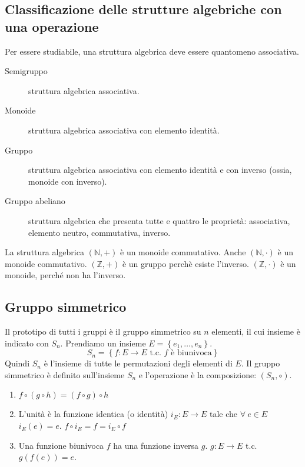 \subsection{Classificazione delle strutture algebriche con una operazione}

Per essere studiabile, una struttura algebrica deve essere quantomeno associativa.

\begin{description}
    \item[Semigruppo] struttura algebrica associativa.
    \item[Monoide] struttura algebrica associativa con elemento identit\`a.
    \item[Gruppo] struttura algebrica associativa con elemento identit\`a e con inverso (ossia, monoide con inverso).
    \item[Gruppo abeliano] struttura algebrica che presenta tutte e quattro le propriet\`a: associativa, elemento neutro, commutativa, inverso.
\end{description}

La struttura algebrica $\left( \mathbb{N}, + \right)$ \`e un monoide commutativo. Anche $\left( \mathbb{N}, \cdot \right)$ \`e un monoide commutativo. $\left( \mathbb{Z}, + \right)$ \`e un gruppo perch\`e esiste l'inverso. $\left( \mathbb{Z}, \cdot \right)$ \`e un monoide, perch\'e non ha l'inverso.

\subsection{Gruppo simmetrico}

\begin{defn}
Il prototipo di tutti i gruppi \`e il gruppo simmetrico su $n$ elementi, il cui insieme \`e indicato con $S_n$. Prendiamo un insieme $E = \left\{ e_1, \dots, e_n \right\}$.
\[
S_n = \left\{ f : E \to E \text{ t.c. $f$ \`e biunivoca} \right\}
\]
Quindi $S_n$ \`e l'insieme di tutte le permutazioni degli elementi di $E$. Il gruppo simmetrico \`e definito sull'insieme $S_n$ e l'operazione \`e la composizione: $\left( S_n, \circ \right)$.
\begin{enumerate}
    \item $f \circ \left( g \circ h \right) = \left( f \circ g \right) \circ h$ 
    \item L'unit\`a \`e la funzione identica (o identit\`a) $i_E : E \to E$ tale che $\forall \ e \in E $ $i_E(e) = e$. $f \circ i_E = f = i_E \circ f$ 
    \item Una funzione biunivoca $f$ ha una funzione inversa $g$. $g : E \to E $ t.c. $ g(f(e)) = e$.
\end{enumerate}
\end{defn}

